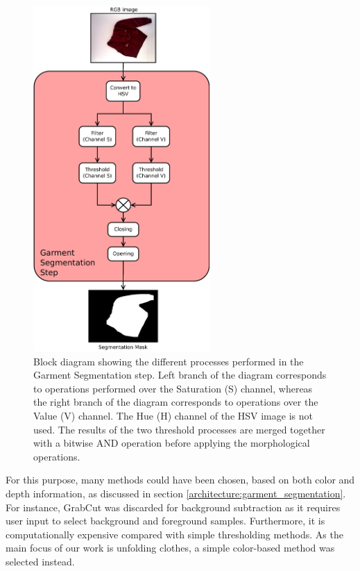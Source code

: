 \begin{figure}[thpb]
    \centering
    \includegraphics[width=0.6\textwidth]
    {figures/Garment-segmentation-process-diagram.pdf}
    \caption{Block diagram showing the different processes performed in the Garment Segmentation step. Left branch of the diagram corresponds to operations performed over the Saturation (S) channel, whereas the right branch of the diagram corresponds to operations over the Value (V) channel. The Hue (H) channel of the HSV image is not used. The results of the two threshold processes are merged together with a bitwise AND operation before applying the morphological operations.}
    \label{fig:background_subtration_processes}
\end{figure}

For this purpose, many methods could have been chosen, based on both color and depth information, as discussed in section \ref{architecture:garment_segmentation}. For instance, GrabCut  was discarded for background subtraction as it requires user input to select background and foreground samples. Furthermore, it is computationally expensive compared with simple thresholding methods. As the main focus of our work is unfolding clothes, a simple color-based method was selected instead. 


